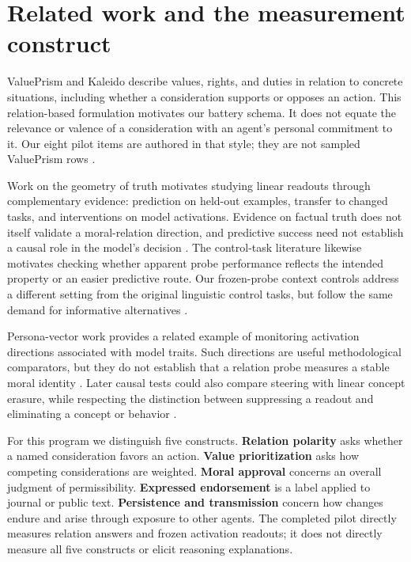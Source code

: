 \section{Related work and the measurement construct}\label{related-work-and-the-measurement-construct}

ValuePrism and Kaleido describe values, rights, and duties in relation to concrete situations, including whether a consideration supports or opposes an action. This relation-based formulation motivates our battery schema. It does not equate the relevance or valence of a consideration with an agent's personal commitment to it. Our eight pilot items are authored in that style; they are not sampled ValuePrism rows \citep{sorensen2024value}.

Work on the geometry of truth motivates studying linear readouts through complementary evidence: prediction on held-out examples, transfer to changed tasks, and interventions on model activations. Evidence on factual truth does not itself validate a moral-relation direction, and predictive success need not establish a causal role in the model's decision \citep{marks2024geometry}. The control-task literature likewise motivates checking whether apparent probe performance reflects the intended property or an easier predictive route. Our frozen-probe context controls address a different setting from the original linguistic control tasks, but follow the same demand for informative alternatives \citep{hewitt2019designing}.

Persona-vector work provides a related example of monitoring activation directions associated with model traits. Such directions are useful methodological comparators, but they do not establish that a relation probe measures a stable moral identity \citep{chen2025persona}. Later causal tests could also compare steering with linear concept erasure, while respecting the distinction between suppressing a readout and eliminating a concept or behavior \citep{belrose2023leace}.

For this program we distinguish five constructs. \textbf{Relation polarity} asks whether a named consideration favors an action. \textbf{Value prioritization} asks how competing considerations are weighted. \textbf{Moral approval} concerns an overall judgment of permissibility. \textbf{Expressed endorsement} is a label applied to journal or public text. \textbf{Persistence and transmission} concern how changes endure and arise through exposure to other agents. The completed pilot directly measures relation answers and frozen activation readouts; it does not directly measure all five constructs or elicit reasoning explanations.

